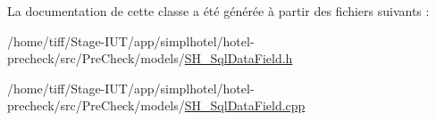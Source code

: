 La documentation de cette classe a été générée à partir des fichiers suivants \-:\begin{DoxyCompactItemize}
\item 
/home/tiff/\-Stage-\/\-I\-U\-T/app/simplhotel/hotel-\/precheck/src/\-Pre\-Check/models/\hyperlink{SH__SqlDataField_8h}{S\-H\-\_\-\-Sql\-Data\-Field.\-h}\item 
/home/tiff/\-Stage-\/\-I\-U\-T/app/simplhotel/hotel-\/precheck/src/\-Pre\-Check/models/\hyperlink{SH__SqlDataField_8cpp}{S\-H\-\_\-\-Sql\-Data\-Field.\-cpp}\end{DoxyCompactItemize}
